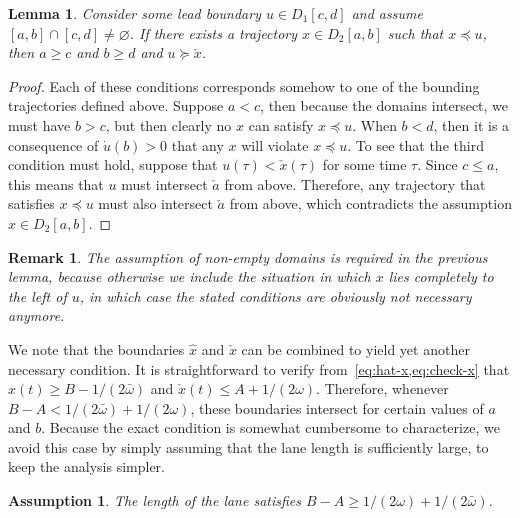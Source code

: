 \documentclass[a4paper]{report}
\theoremstyle{definition}
\theoremstyle{plain}
\newtheorem{lemma}{Lemma}[chapter]
\newtheorem{assump}{Assumption}[chapter]
\newtheorem*{remark}{Remark}
\begin{document}
\begin{lemma}\label{lemma:necessary-conditions}
  Consider some lead boundary $u \in D_{1}[c,d]$ and assume
  $[a,b] \cap [c,d] \neq \varnothing$. If there exists a trajectory
  $x \in D_{2}[a, b]$ such that $x \preceq u$, then $a \geq c$ and $b \geq d$ and $u \succeq \check{x}$.
\end{lemma}
\pagebreak[1]
\begin{proof}
  Each of these conditions corresponds somehow to one of the bounding
  trajectories defined above.
  Suppose $a < c$, then because the domains intersect, we must have $b > c$, but
  then clearly no $x$ can satisfy $x \preceq u$.
  When $b < d$, then it is a consequence of $\dot{u}(b) > 0$ that any $x$ will
  violate $x \preceq u$.
  To see that the third condition must hold, suppose that $u(\tau) < \check{x}(\tau)$
  for some time $\tau$. Since $c \leq a$, this means that $u$ must intersect
  $\check{a}$ from above. Therefore, any trajectory that satisfies $x \preceq u$
  must also intersect $\check{a}$ from above, which contradicts the assumption
  $x \in D_{2}[a,b]$.
\end{proof}

\begin{remark}
  The assumption of non-empty domains is required in the previous lemma, because
  otherwise we include the situation in which $x$ lies completely to the left of
  $u$, in which case the stated conditions are obviously not necessary anymore.
\end{remark}

We note that the boundaries $\hat{x}$ and $\check{x}$ can be combined to
yield yet another necessary condition.
%
It is straightforward to verify from~\cref{eq:hat-x,eq:check-x} that
$\hat{x}(t) \geq B - 1/(2\bar{\omega})$ and $\check{x}(t) \leq A + 1/(2\omega)$.
%
Therefore, whenever $B - A < 1/(2\bar{\omega}) + 1/(2\omega)$, these boundaries intersect
for certain values of $a$ and $b$.
%
Because the exact condition is somewhat cumbersome to characterize, we avoid
this case by simply assuming that the lane length is sufficiently large, to keep
the analysis simpler.

\begin{assump}\label{assump:lane-length}
  The length of the lane satisfies $B - A \geq 1/(2\omega) + 1/(2\bar{\omega})$.
\end{assump}
\end{document}
